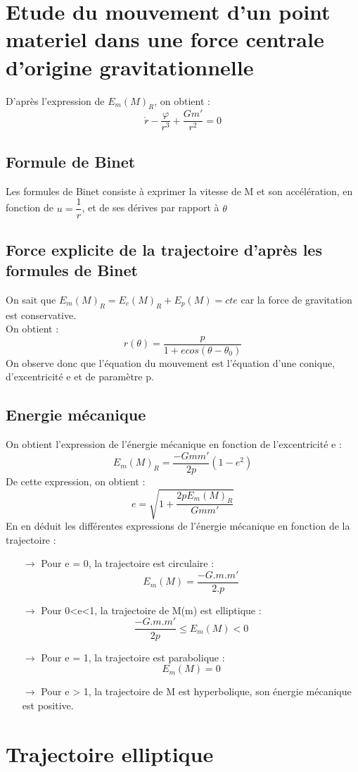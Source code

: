 \section{Etude du mouvement d'un point materiel dans une force centrale d'origine gravitationnelle}
D'après l'expression de $E_m(M)_R$, on obtient : 
$$\mathring{r}\mathring{} - \dfrac{\varphi}{r^3} + \dfrac{Gm'}{r^2}=0$$
\subsection{Formule de Binet}
\begin{prop}
Les formules de Binet consiste à exprimer la vitesse de M et son accélération, en fonction de $u = \dfrac{1}{r}$, et de ses dérives par rapport à $\theta$
\end{prop}
\subsection{Force explicite de la trajectoire d'après les formules de Binet}
On sait que $E_m(M)_R = E_c(M)_R + E_p(M) = cte$ car la force de gravitation est conservative.\\
On obtient :
$$r(\theta) = \dfrac{p}{1+ecos(\theta - \theta_0)}$$
On observe donc que l'équation du mouvement est l'équation d'une conique, d'excentricité e et de paramètre p.
\subsection{Energie mécanique}
On obtient l'expression de l'énergie mécanique en fonction de l'excentricité e :
$$E_{m}(M)_R = \dfrac{-Gmm'}{2p}(1-e^2)$$
De cette expression, on obtient :
$$e = \sqrt{1 + \dfrac{2pE_m(M)_R}{Gmm'}}$$
En en déduit les différentes expressions de l'énergie mécanique en fonction de la trajectoire :
\begin{itemize}
 \item[$\rightarrow$] Pour e = 0, la trajectoire est circulaire :$$E_m(M) = \dfrac{-G.m.m'}{2.p}$$
 \item[$\rightarrow$] Pour 0<e<1, la trajectoire de M(m) est elliptique : $$\dfrac{-G.m.m'}{2p} \leq E_m(M) < 0$$
 \item[$\rightarrow$] Pour e = 1, la trajectoire est parabolique : $$E_m(M) = 0$$
 \item[$\rightarrow$] Pour e > 1, la trajectoire de M est hyperbolique, son énergie mécanique est positive.
\end{itemize}

\section{Trajectoire elliptique}
